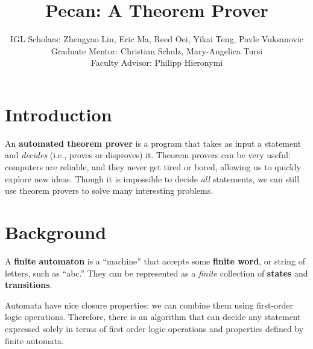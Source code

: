 \documentclass[10pt,usenames,dvipsnames]{article}
\title{Pecan: A Theorem Prover}
\author{%
IGL Scholars: Zhengyao Lin, Eric Ma, Reed Oei, Yikai Teng, Pavle Vuksanovic \\
Graduate Mentor: Christian Schulz, Mary-Angelica Tursi \\
Faculty Advisor: Philipp Hieronymi%
}
\begin{document}
\maketitle


\section{Introduction}

An \textbf{automated theorem prover} is a program that takes as input a statement and \emph{decides} (i.e., proves or disproves) it. 
Theorem provers can be very useful: computers are reliable, and they never get tired or bored, allowing us to quickly explore new ideas.
Though it is impossible to decide \emph{all} statements, we can still use theorem provers to solve many interesting problems. 

\section{Background}

A \textbf{finite automaton} is a ``machine'' that accepts some \textbf{finite word}, or string of letters, such as ``abc.''
They can be represented as a \emph{finite} collection of \textbf{states} and \textbf{transitions}.

Automata have nice closure properties: we can combine them using first-order logic operations.
Therefore, there is an algorithm that can decide any statement expressed solely in terms of first order logic operations and properties defined by finite automata.


\end{document}
